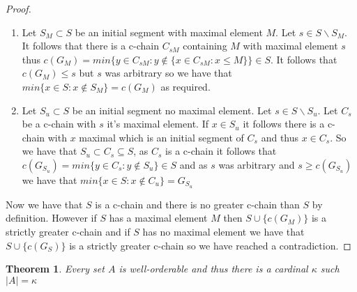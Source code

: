 \documentclass{report}
\newtheorem{theorem}{Theorem}[section]
\begin{document}
\begin{proof}
\begin{enumerate}
\item Let \(S_M \subset S\) be an initial segment with maximal element \(M\). Let \(s \in S\backslash S_M\). It follows that there is a c-chain \(C_{sM}\) containing \(M\) with maximal element \(s\) thus \(c(G_M) = min\{y \in C_{sM}:y \notin\{x \in C_{sM}:x \leq M\} \} \in S\). It follows that \(c(G_M) \leq s\) but \(s\) was arbitrary so we have that \(min\{x \in S: x \notin S_M\} = c(G_M)\) as required.\\
\item Let \(S_u \subset S\) be an initial segment no maximal element. Let \(s \in S\backslash S_u\). Let \(C_s\) be a c-chain with \(s\) it's maximal element. If \(x \in S_u\) it follows there is a c-chain with \(x\) maximal which is an initial segment of \(C_s\) and thus \(x \in C_s\). So we have that \(S_u \subset C_s \subseteq S\), as \(C_s\) is a c-chain it follows that \(c(G_{S_u}) = min\{y \in C_{s}:y \notin S_{u} \}\in S\) and as \(s\) was arbitrary and \(s \geq c(G_{S_u})\) we have that \(min\{x \in S: x \notin C_u\}=G_{S_u}\)\\
\end{enumerate}
Now we have that \(S\) is a c-chain and there is no greater c-chain than \(S\) by definition. However if \(S\) has a maximal element \(M\) then \(S \cup \{c(G_{M})\}\) is a strictly greater c-chain and if \(S\) has no maximal element we have that \(S \cup \{c(G_{S})\}\) is a strictly greater c-chain so we have reached a contradiction.
\end{proof}
\begin{theorem}
Every set $A$ is well-orderable and thus there is a cardinal $\kappa$ such $\vert A\vert = \kappa$
\end{theorem}
\end{document}
